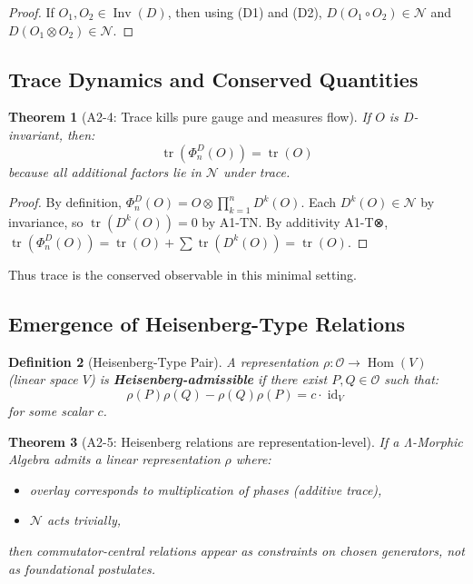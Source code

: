 \documentclass[12pt, oneside]{article}
\newtheorem{theorem}{Theorem}[section]
\newtheorem{definition}[theorem]{Definition}
\DeclareMathOperator{\id}{id}
\DeclareMathOperator{\tr}{tr}
\DeclareMathOperator{\Inv}{Inv}
\DeclareMathOperator{\Hom}{Hom}
\newcommand{\N}{\mathcal{N}}
\newcommand{\Opr}{\mathcal{O}}
\begin{document}
\begin{proof}
If $O_1, O_2 \in \Inv(D)$, then using (D1) and (D2), $D(O_1 \circ O_2) \in \N$ and $D(O_1 \otimes O_2) \in \N$.
\end{proof}

\subsection{Trace Dynamics and Conserved Quantities}

\begin{theorem}[A2-4: Trace kills pure gauge and measures flow]
If $O$ is $D$-invariant, then:
\begin{equation}
\tr(\Phi_n^D(O)) = \tr(O)
\end{equation}
because all additional factors lie in $\N$ under trace.
\end{theorem}

\begin{proof}
By definition, $\Phi_n^D(O) = O \otimes \prod_{k=1}^n D^k(O)$. Each $D^k(O) \in \N$ by invariance, so $\tr(D^k(O)) = 0$ by A1-TN. By additivity A1-T⊗, $\tr(\Phi_n^D(O)) = \tr(O) + \sum \tr(D^k(O)) = \tr(O)$.
\end{proof}

Thus trace is the conserved observable in this minimal setting.

\subsection{Emergence of Heisenberg-Type Relations}

\begin{definition}[Heisenberg-Type Pair]
A representation $\rho: \Opr \rightarrow \Hom(V)$ (linear space $V$) is \textbf{Heisenberg-admissible} if there exist $P, Q \in \Opr$ such that:
\begin{equation}
\rho(P)\rho(Q) - \rho(Q)\rho(P) = c \cdot \id_V
\end{equation}
for some scalar $c$.
\end{definition}

\begin{theorem}[A2-5: Heisenberg relations are representation-level]
If a Λ-Morphic Algebra admits a linear representation $\rho$ where:
\begin{itemize}
    \item overlay corresponds to multiplication of phases (additive trace),
    \item $\N$ acts trivially,
\end{itemize}
then commutator-central relations appear as constraints on chosen generators, not as foundational postulates.
\end{theorem}
\end{document}
